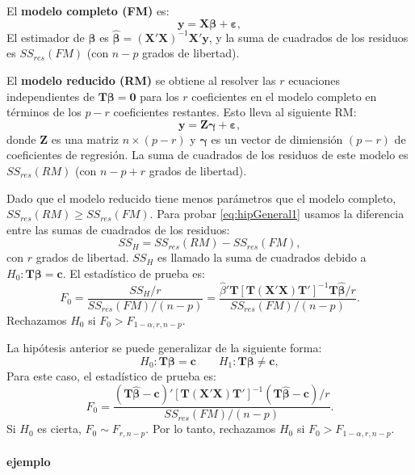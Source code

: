 \documentclass[
]{article}
\begin{document}
El \textbf{modelo completo (FM)} es:
\[
\boldsymbol y=\boldsymbol X\boldsymbol \beta+\boldsymbol \varepsilon,
\]
El estimador de \(\boldsymbol \beta\) es \(\widehat{\boldsymbol \beta}= (\boldsymbol X'\boldsymbol X)^{-1}\boldsymbol X'\boldsymbol y\), y la suma de cuadrados de los residuos es \(SS_{res}(FM)\) (con \(n-p\) grados de libertad).

El \textbf{modelo reducido (RM)} se obtiene al resolver las \(r\) ecuaciones independientes de \(\boldsymbol T\boldsymbol \beta= \boldsymbol 0\) para los \(r\) coeficientes en el modelo completo en términos de los \(p-r\) coeficientes restantes. Esto lleva al siguiente RM:
\[
\boldsymbol y=\boldsymbol Z\boldsymbol \gamma+\boldsymbol \varepsilon,
\]
donde \(\boldsymbol Z\) es una matriz \(n\times (p-r)\) y \(\boldsymbol \gamma\) es un vector de dimiensión \((p-r)\) de coeficientes de regresión. La suma de cuadrados de los residuos de este modelo es \(SS_{res}(RM)\) (con \(n-p+r\) grados de libertad).

Dado que el modelo reducido tiene menos parámetros que el modelo completo, \(SS_{res}(RM) \geq SS_{res}(FM)\). Para probar \eqref{eq:hipGeneral1} usamos la diferencia entre las sumas de cuadrados de los residuos:
\[
SS_{H} = SS_{res}(RM) - SS_{res}(FM),
\]
con \(r\) grados de libertad. \(SS_{H}\) es llamado la suma de cuadrados debido a \(H_{0}:\boldsymbol T\boldsymbol \beta=\boldsymbol c\). El estadístico de prueba es:
\[
F_{0} = \frac{SS_{H}/r}{SS_{res}(FM)/(n-p)} = \frac{\widehat{\beta}'\boldsymbol T[\boldsymbol T(\boldsymbol X'\boldsymbol X)\boldsymbol T']^{-1}\boldsymbol T\widehat{\boldsymbol \beta}/r}{SS_{res}(FM)/(n-p)}.
\]
Rechazamos \(H_{0}\) si \(F_{0} > F_{1-\alpha,r,n-p}\).

La hipótesis anterior se puede generalizar de la siguiente forma:
\begin{equation}
H_{0}: \boldsymbol T\boldsymbol \beta=\boldsymbol c\qquad H_{1}: \boldsymbol T\boldsymbol \beta\neq \boldsymbol c,
\label{eq:hipGeneral2}
\end{equation}
Para este caso, el estadístico de prueba es:
\[
F_{0} = \frac{(\boldsymbol T\widehat{\boldsymbol \beta}-\boldsymbol c)'[\boldsymbol T(\boldsymbol X'\boldsymbol X)\boldsymbol T']^{-1}(\boldsymbol T\widehat{\boldsymbol \beta}-\boldsymbol c)/r}{SS_{res}(FM)/(n-p)}.
\]
Si \(H_{0}\) es cierta, \(F_{0}\sim F_{r,n-p}\). Por lo tanto, rechazamos \(H_{0}\) si \(F_{0} > F_{1-\alpha,r,n-p}\).

\hypertarget{ejemplo-1}{%
\paragraph*{ejemplo}\label{ejemplo-1}}
\end{document}
